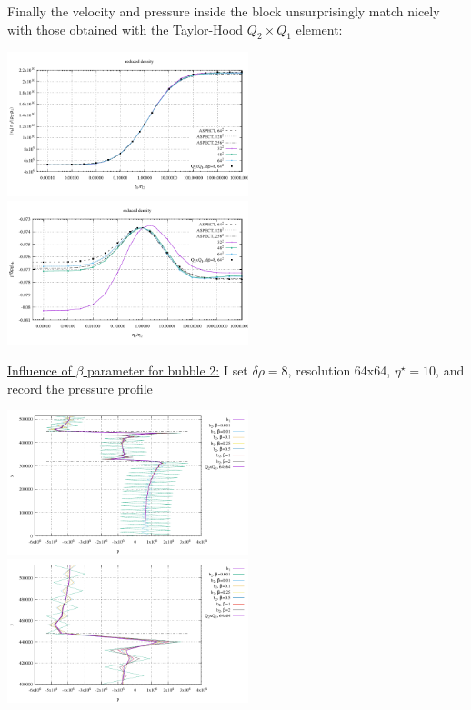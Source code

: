 Finally the velocity and pressure inside the block unsurprisingly match nicely with those obtained with the Taylor-Hood
$Q_2\times Q_1$ element:

\begin{center}
\includegraphics[width=7cm]{python_codes/fieldstone_72/results/block/reduced/results_v}
\includegraphics[width=7cm]{python_codes/fieldstone_72/results/block/reduced/results_p}
\end{center}


\underline{Influence of $\beta$ parameter for bubble 2:} I set $\delta\rho=8$, resolution 64x64, $\eta^\star=10$,
and record the pressure profile 

\begin{center}
\includegraphics[width=7cm]{python_codes/fieldstone_72/results/block/reduced/betastudy/plines}
\includegraphics[width=7cm]{python_codes/fieldstone_72/results/block/reduced/betastudy/plines_zoom}
\end{center}

